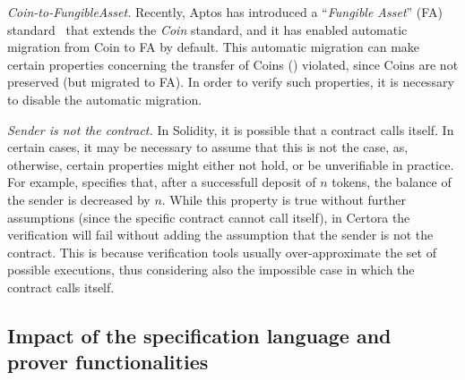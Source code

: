 \emph{Coin-to-FungibleAsset.} Recently, Aptos has introduced a ``\emph{Fungible Asset}'' (FA) standard~\cite{aptos-fungible-asset} that extends the \emph{Coin} standard, and it has enabled automatic migration from Coin to FA by default. This automatic migration can make certain properties  concerning the transfer of Coins (\eg {}) violated, since Coins are not preserved (but migrated to FA). In order to verify such properties, it is necessary to disable the automatic migration.      

\emph{Sender is not the contract.} In Solidity, it is possible that a contract calls itself. 
In certain cases, it may be necessary to assume that this is not the case, as, otherwise, certain properties might either not hold, or be unverifiable in practice. For example,  specifies that, after a successfull deposit of $n$ tokens, the balance of the sender is decreased by $n$. 
While this property is true without further assumptions (since the specific  contract cannot call itself), in Certora the verification will fail without adding the assumption that the sender is not the contract.
This is because verification tools usually over-approximate the set of possible executions, thus considering also the impossible case in which the contract calls itself.

 
\subsection{Impact of the specification language and prover functionalities}
\label{sec:comparison:prover}



